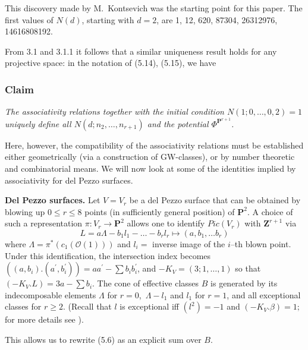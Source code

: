 \documentclass[reqno]{amsart}
\theoremstyle{definition}
\begin{document}

\smallskip

This discovery made by M.~Kontsevich was the starting point for this
paper.
The first values of $N(d)$, starting with $d=2$, are
1, 12, 620, 87304, 26312976, 14616808192.

\smallskip

From 3.1 and 3.1.1 it follows that a similar uniqueness result
holds for any projective space: in the notation of (5.14), (5.15),
we have

\medskip

\subsubsection{Claim}
{\it
  The associativity relations
  together with the
  initial condition $N(1;0,\dots ,0,2)=1$ uniquely define
  all $N(d;n_2,\dots ,n_{r+1})$ and the potential $\Phi^{\mathbf{P}^{r+1}}$.
}


\smallskip

Here, however, the compatibility of the associativity relations must be
established either geometrically (via a construction of GW-classes),
or by number theoretic and combinatorial means. We will now look
at some of the identities implied by associativity for del Pezzo
surfaces.

\medskip

{\bf Del Pezzo surfaces.}
Let $V=V_r$ be a del Pezzo surface
that can be obtained by blowing up $0\le r\le 8$ points
(in sufficiently general position) of $\mathbf{P}^2$.
A choice of such a representation $\pi :V_r\to \mathbf{P}^2$
allows one to identify $Pic(V_r)$ with $\mathbf{Z}^{r+1}$
via
\[
  L=a\Lambda -b_1l_1-\dots -b_rl_r \mapsto (a,b_1,\dots b_r)
\]
where $\Lambda =\pi^*(c_1(\mathcal{O}(1)))$ and $l_i=$ inverse
image of the $i$--th blown point. Under this identification,
the intersection index becomes $((a,b_i).(a^{\prime},b_i^{\prime}))
=aa^{\prime}-\sum b_ib_i^{\prime}$, and $-K_V=(3;1,\dots ,1)$
so that $(-K_V.L)=3a-\sum b_i$. The cone of effective classes
$B$ is generated by its indecomposable elements
$\Lambda$ for $r=0$,\ $\Lambda -l_1$
and $l_1$ for $r=1$, and all exceptional classes for $r\ge 2$.
(Recall that $l$ is exceptional iff $(l^2)=-1$ and $(-K_V.\beta )=1;$
for more details see \cite{Ma1}).

\smallskip

This allows us to rewrite (5.6) as an explicit sum over $B$.
\end{document}
